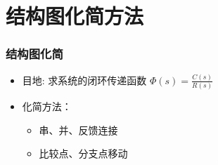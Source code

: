 \documentclass{beamer}
\begin{document}
\section{结构图化简方法}
\label{sec-2}
\begin{frame}
\frametitle{结构图化简}
\label{sec-2-1}

\begin{itemize}
\item <2-> 目地: 求系统的闭环传递函数 $\Phi(s)=\frac{C(s)}{R(s)}$
\item <3-> 化简方法：
\begin{itemize}
\item <4-> 串、并、反馈连接
\item <5-> 比较点、分支点移动
\end{itemize}
\end{itemize}
\end{frame}
\end{document}
